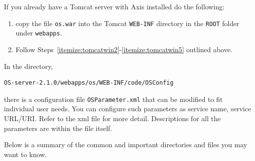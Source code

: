 \documentclass[11pt]{article}
\renewcommand{\_}{{\char"5F}}
\renewcommand{\{}{{\char"7B}}
\renewcommand{\}}{{\char"7D}}
\renewcommand{\^}{{\char"0D}}
\renewcommand{\'}{{\char"0D}}
\begin{document}
\begin{enumerate}[Step 1:]
\vskip 8pt

If you already have a Tomcat server with Axis installed do the following:
\begin{enumerate}
\item{} copy the file {\tt os.war} into the Tomcat {\tt WEB-INF} directory in the {\tt ROOT} folder under {\tt webapps}.

\item{}  Follow Steps~\ref{itemize:tomcatwin2}-\ref{itemize:tomcatwin5} outlined above.
\end{enumerate}

In the directory,
\begin{verbatim}
OS-server-2.1.0/webapps/os/WEB-INF/code/OSConfig
\end{verbatim}
there is a configuration file {\tt OSParameter.xml} that can be modified to fit individual user needs. You can configure such parameters as service name, service URL/URI. Refer to the xml file for more detail. Descriptions for all the parameters are within the file itself.

\vskip 8pt

Below is a summary of the common and important directories and files you may want to know.


\end{enumerate}
\end{document}
